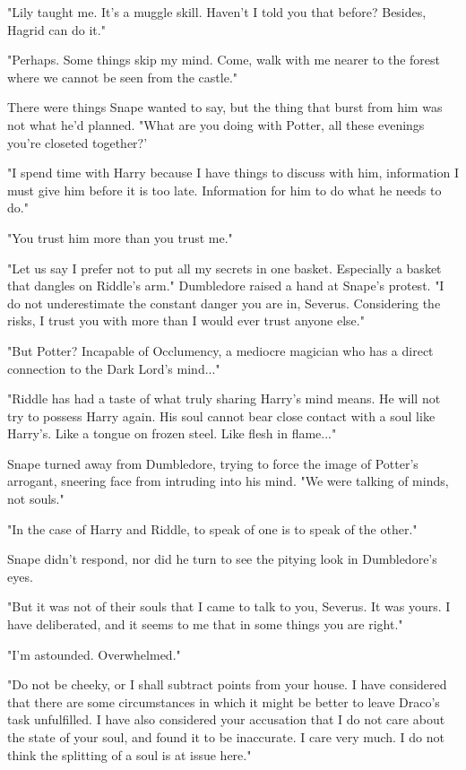 "Lily taught me. It's a muggle skill. Haven't I told you that before? Besides, Hagrid can do it."

"Perhaps. Some things skip my mind. Come, walk with me nearer to the forest where we cannot be seen from the castle."

There were things Snape wanted to say, but the thing that burst from him was not what he'd planned. "What are you doing with Potter, all these evenings you're closeted together?'

"I spend time with Harry because I have things to discuss with him, information I must give him before it is too late. Information for him to do what he needs to do."

"You trust him more than you trust me."

"Let us say I prefer not to put all my secrets in one basket. Especially a basket that dangles on Riddle's arm." Dumbledore raised a hand at Snape's protest. "I do not underestimate the constant danger you are in, Severus. Considering the risks, I trust you with more than I would ever trust anyone else."

"But Potter? Incapable of Occlumency, a mediocre magician who has a direct connection to the Dark Lord's mind..."

"Riddle has had a taste of what truly sharing Harry's mind means. He will not try to possess Harry again. His soul cannot bear close contact with a soul like Harry's. Like a tongue on frozen steel. Like flesh in flame..."

Snape turned away from Dumbledore, trying to force the image of Potter's arrogant, sneering face from intruding into his mind. "We were talking of minds, not souls."

"In the case of Harry and Riddle, to speak of one is to speak of the other."

Snape didn't respond, nor did he turn to see the pitying look in Dumbledore's eyes.

"But it was not of their souls that I came to talk to you, Severus. It was yours. I have deliberated, and it seems to me that in some things you are right."

"I'm astounded. Overwhelmed."

"Do not be cheeky, or I shall subtract points from your house. I have considered that there are some circumstances in which it might be better to leave Draco's task unfulfilled. I have also considered your accusation that I do not care about the state of your soul, and found it to be inaccurate. I care very much. I do not think the splitting of a soul is at issue here."

